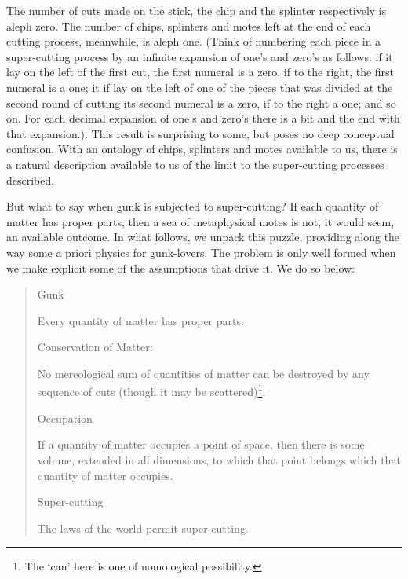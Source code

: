 \documentclass[
  10pt,
  letterpaper,
  DIV=11,
  numbers=noendperiod,
  twoside]{scrartcl}
\providecommand{\tightlist}{%
  \setlength{\itemsep}{0pt}\setlength{\parskip}{0pt}}\usepackage{longtable,booktabs,array}
\begin{document}
The number of cuts made on the stick, the chip and the splinter
respectively is aleph zero. The number of chips, splinters and motes
left at the end of each cutting process, meanwhile, is aleph one. (Think
of numbering each piece in a super-cutting process by an infinite
expansion of one's and zero's as follows: if it lay on the left of the
first cut, the first numeral is a zero, if to the right, the first
numeral is a one; it if lay on the left of one of the pieces that was
divided at the second round of cutting its second numeral is a zero, if
to the right a one; and so on. For each decimal expansion of one's and
zero's there is a bit and the end with that expansion.). This result is
surprising to some, but poses no deep conceptual confusion. With an
ontology of chips, splinters and motes available to us, there is a
natural description available to us of the limit to the super-cutting
processes described.

But what to say when gunk is subjected to super-cutting? If each
quantity of matter has proper parts, then a sea of metaphysical motes is
not, it would seem, an available outcome. In what follows, we unpack
this puzzle, providing along the way some a priori physics for
gunk-lovers. The problem is only well formed when we make explicit some
of the assumptions that drive it. We do so below:

\begin{quote}
\begin{description}
\tightlist
\item[(1)]
Gunk
\end{description}

Every quantity of matter has proper parts.

\begin{description}
\tightlist
\item[(2)]
Conservation of Matter:
\end{description}

No mereological sum of quantities of matter can be destroyed by any
sequence of cuts (though it may be scattered)\footnote{The `can' here is
  one of nomological possibility.}.

\begin{description}
\tightlist
\item[(3)]
Occupation
\end{description}

If a quantity of matter occupies a point of space, then there is some
volume, extended in all dimensions, to which that point belongs which
that quantity of matter occupies.

\begin{description}
\tightlist
\item[(4)]
Super-cutting
\end{description}

The laws of the world permit super-cutting.
\end{quote}
\end{document}
